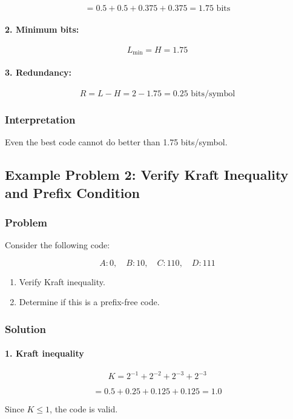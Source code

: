 \documentclass{AnantDocumentation}
\begin{document}
\[
= 0.5 + 0.5 + 0.375 + 0.375 = 1.75 \text{ bits}
\]

\paragraph{2. Minimum bits:}
\[
L_{\min} = H = 1.75
\]

\paragraph{3. Redundancy:}
\[
R = L - H = 2 - 1.75 = 0.25 \text{ bits/symbol}
\]

\subsubsection*{Interpretation}

Even the best code cannot do better than 1.75 bits/symbol.

\subsection{Example Problem 2: Verify Kraft Inequality and Prefix Condition}

\subsubsection*{Problem}

Consider the following code:

\[
A: 0,\quad
B: 10,\quad
C: 110,\quad
D: 111
\]

\begin{enumerate}
\item Verify Kraft inequality.
\item Determine if this is a prefix-free code.
\end{enumerate}

\subsubsection*{Solution}

\paragraph{1. Kraft inequality}

\[
K = 2^{-1} + 2^{-2} + 2^{-3} + 2^{-3}
\]

\[
= 0.5 + 0.25 + 0.125 + 0.125 = 1.0
\]

Since \(K \le 1\), the code is valid.
\end{document}
